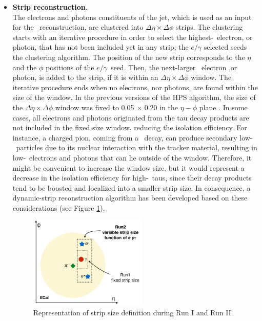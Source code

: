 \begin{itemize}
 \item \textbf{Strip reconstruction}. \\

The electrons and photons constituents of the jet, which is used as an input 
for the \tauh~reconstruction, are clustered into $\Delta\eta \times \Delta\phi$ 
strips. The clustering starts with an iterative procedure in order to select 
the highest-\pt~electron, or photon, that has not been included yet in any 
strip; the $e/\gamma$ selected seeds the clustering algorithm. The position of 
the new strip corresponds to the $\eta$ and the $\phi$ positions of the 
$e/\gamma$~seed. Then, the next-larger \pt~electron ,or photon, is 
added to the strip, if it is within an $\Delta\eta \times \Delta\phi$ window. 
The iterative procedure ends when no electrons, nor photons, are found
within the size of the window. In the previous versions of the HPS algorithm,
the size of the $\Delta\eta \times \Delta\phi$ window was fixed to 0.05 $\times$ 0.20 in the $\eta-\phi$ 
plane \cite{TauReconstructionCMSRun1}. In some cases, all 
electrons and photons originated from the tau decay products are not 
included in the fixed size window, reducing the isolation efficiency. For instance,
a charged pion, coming from a \tauh~decay, can produce secondary 
low-\pt~particles due to its nuclear interaction with the tracker 
material, resulting in low-\pt~electrons and photons 
that can lie outside of the window. Therefore, it 
might be convenient to increase the window size, but it would represent a 
decrease in the isolation efficiency for high-\pt~taus, since 
their decay products tend to be boosted and localized into a smaller strip size. In 
consequence, a dynamic-strip reconstruction algorithm has been 
developed based on these considerations (see Figure \ref{fig:StripReco}). \\

\begin{figure}[ht]
  \begin{center}
    \includegraphics[width=0.53\textwidth]{figuras/Chapter3/StripReco.png}
    \caption{Representation of strip size definition during Run I and Run II.}
    \label{fig:StripReco}
  \end{center}
\end{figure} 


\end{itemize}
